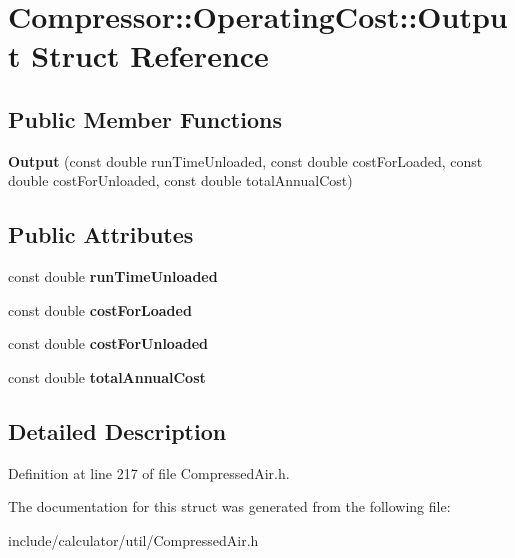 \hypertarget{struct_compressor_1_1_operating_cost_1_1_output}{}\section{Compressor\+:\+:Operating\+Cost\+:\+:Output Struct Reference}
\label{struct_compressor_1_1_operating_cost_1_1_output}
\subsection*{Public Member Functions}
\begin{DoxyCompactItemize}
\item 
\mbox{\label{struct_compressor_1_1_operating_cost_1_1_output_af510363e57a9f58bdd56f9a16784697e}} 
{\bfseries Output} (const double run\+Time\+Unloaded, const double cost\+For\+Loaded, const double cost\+For\+Unloaded, const double total\+Annual\+Cost)
\end{DoxyCompactItemize}
\subsection*{Public Attributes}
\begin{DoxyCompactItemize}
\item 
\mbox{\label{struct_compressor_1_1_operating_cost_1_1_output_ae13051fb802def8fc6e18209db38b5aa}} 
const double {\bfseries run\+Time\+Unloaded}
\item 
\mbox{\label{struct_compressor_1_1_operating_cost_1_1_output_a4c65ee9ba069d432cf837f42a4702121}} 
const double {\bfseries cost\+For\+Loaded}
\item 
\mbox{\label{struct_compressor_1_1_operating_cost_1_1_output_a0e307a677ed5dbf7dba5b061cf5bfccf}} 
const double {\bfseries cost\+For\+Unloaded}
\item 
\mbox{\label{struct_compressor_1_1_operating_cost_1_1_output_a245a4b7baeb985a60d11b65f866563f0}} 
const double {\bfseries total\+Annual\+Cost}
\end{DoxyCompactItemize}


\subsection{Detailed Description}


Definition at line 217 of file Compressed\+Air.\+h.



The documentation for this struct was generated from the following file\+:\begin{DoxyCompactItemize}
\item 
include/calculator/util/Compressed\+Air.\+h\end{DoxyCompactItemize}
